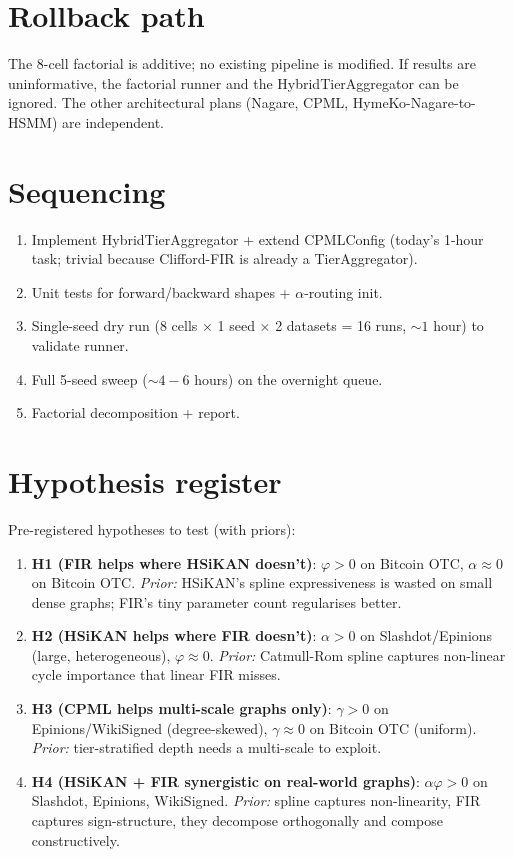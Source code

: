 \documentclass[11pt]{article}
\begin{document}
\section{Rollback path}

The 8-cell factorial is additive; no existing pipeline is modified.
If results are uninformative, the factorial runner and the
HybridTierAggregator can be ignored. The other architectural plans
(Nagare, CPML, HymeKo-Nagare-to-HSMM) are independent.

\section{Sequencing}

\begin{enumerate}
  \item Implement HybridTierAggregator + extend CPMLConfig (today's
    1-hour task; trivial because Clifford-FIR is already a
    TierAggregator).
  \item Unit tests for forward/backward shapes + $\alpha$-routing
    init.
  \item Single-seed dry run (8 cells × 1 seed × 2 datasets = 16
    runs, $\sim 1$ hour) to validate runner.
  \item Full 5-seed sweep ($\sim 4-6$ hours) on the overnight queue.
  \item Factorial decomposition + report.
\end{enumerate}

\section{Hypothesis register}

Pre-registered hypotheses to test (with priors):
\begin{enumerate}
  \item \textbf{H1 (FIR helps where HSiKAN doesn't)}: $\varphi > 0$
    on Bitcoin OTC, $\alpha \approx 0$ on Bitcoin OTC. \emph{Prior:}
    HSiKAN's spline expressiveness is wasted on small dense
    graphs; FIR's tiny parameter count regularises better.
  \item \textbf{H2 (HSiKAN helps where FIR doesn't)}: $\alpha > 0$
    on Slashdot/Epinions (large, heterogeneous), $\varphi \approx 0$.
    \emph{Prior:} Catmull-Rom spline captures non-linear cycle
    importance that linear FIR misses.
  \item \textbf{H3 (CPML helps multi-scale graphs only)}:
    $\gamma > 0$ on Epinions/WikiSigned (degree-skewed),
    $\gamma \approx 0$ on Bitcoin OTC (uniform). \emph{Prior:}
    tier-stratified depth needs a multi-scale to exploit.
  \item \textbf{H4 (HSiKAN + FIR synergistic on real-world graphs)}:
    $\alpha\varphi > 0$ on Slashdot, Epinions, WikiSigned. \emph{Prior:}
    spline captures non-linearity, FIR captures sign-structure,
    they decompose orthogonally and compose constructively.
\end{enumerate}
\end{document}
